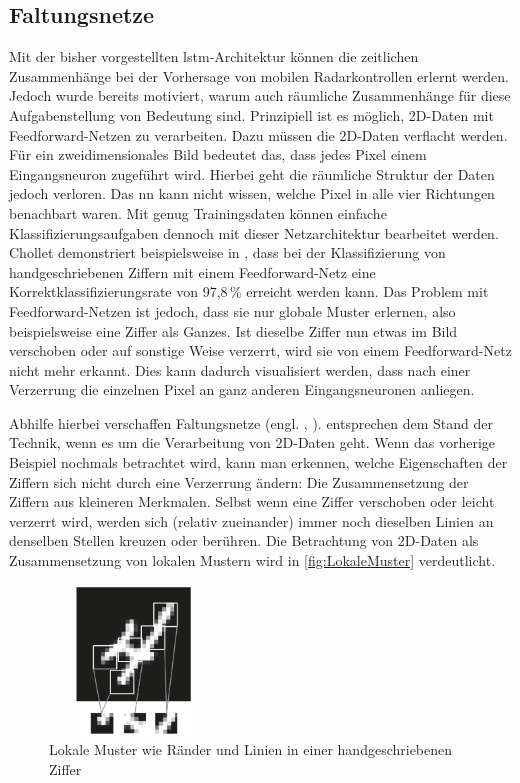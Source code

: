 \subsection{Faltungsnetze}
\label{sec:CNN}

Mit der bisher vorgestellten \acrshort{lstm}-Architektur können die zeitlichen Zusammenhänge bei der Vorhersage von mobilen Radarkontrollen erlernt werden.
Jedoch wurde bereits motiviert, warum auch räumliche Zusammenhänge für diese Aufgabenstellung von Bedeutung sind.
Prinzipiell ist es möglich, 2D-Daten mit Feedforward-Netzen zu verarbeiten.
Dazu müssen die 2D-Daten verflacht werden.
Für ein zweidimensionales Bild bedeutet das, dass jedes Pixel einem Eingangsneuron zugeführt wird.
Hierbei geht die räumliche Struktur der Daten jedoch verloren.
Das \acrshort{nn} kann nicht wissen, welche Pixel in alle vier Richtungen benachbart waren.
Mit genug Trainingsdaten können einfache Klassifizierungsaufgaben dennoch mit dieser Netzarchitektur bearbeitet werden.
Chollet demonstriert beispielsweise in \cite[S. 53]{DeepLearningPythonKeras}, dass bei der Klassifizierung von handgeschriebenen Ziffern mit einem Feedforward-Netz eine Korrektklassifizierungsrate von 97,8\,\% erreicht werden kann.
Das Problem mit Feedforward-Netzen ist jedoch, dass sie nur globale Muster erlernen, also beispielsweise eine Ziffer als Ganzes.
Ist dieselbe Ziffer nun etwas im Bild verschoben oder auf sonstige Weise verzerrt, wird sie von einem Feedforward-Netz nicht mehr erkannt.
Dies kann dadurch visualisiert werden, dass nach einer Verzerrung die einzelnen Pixel an ganz anderen Eingangsneuronen anliegen.

Abhilfe hierbei verschaffen Faltungsnetze (engl. , ).
 entsprechen dem Stand der Technik, wenn es um die Verarbeitung von 2D-Daten geht.
Wenn das vorherige Beispiel nochmals betrachtet wird, kann man erkennen, welche Eigenschaften der Ziffern sich nicht durch eine Verzerrung ändern: Die Zusammensetzung der Ziffern aus kleineren Merkmalen.
Selbst wenn eine Ziffer verschoben oder leicht verzerrt wird, werden sich (relativ zueinander) immer noch dieselben Linien an denselben Stellen kreuzen oder berühren.
Die Betrachtung von 2D-Daten als Zusammensetzung von lokalen Mustern wird in \autoref{fig:LokaleMuster} verdeutlicht.

\begin{figure}[h]
    \centering
    \includegraphics[width=0.4\textwidth,height=4cm,keepaspectratio=true]{content/images/LokaleMuster.png}
    \caption{Lokale Muster wie Ränder und Linien in einer handgeschriebenen Ziffer \cite[Abb. 5.1]{DeepLearningPythonKeras}}
    \label{fig:LokaleMuster}
\end{figure}

